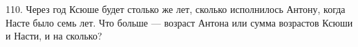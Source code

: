 110. Через год Ксюше будет столько же лет, сколько исполнилось Антону, когда Насте было семь лет. Что больше --- возраст Антона или сумма возрастов Ксюши и Насти, и на сколько?\\
